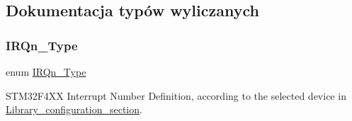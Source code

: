 \subsection{Dokumentacja typów wyliczanych}
\mbox{\label{group___peripheral__interrupt__number__definition_ga7e1129cd8a196f4284d41db3e82ad5c8}} 
\subsubsection{\texorpdfstring{I\+R\+Qn\+\_\+\+Type}{IRQn\_Type}}
{\footnotesize\ttfamily enum \hyperlink{group___peripheral__interrupt__number__definition_ga7e1129cd8a196f4284d41db3e82ad5c8}{I\+R\+Qn\+\_\+\+Type}}



S\+T\+M32\+F4\+XX Interrupt Number Definition, according to the selected device in \hyperlink{group___library__configuration__section}{Library\+\_\+configuration\+\_\+section}. 

